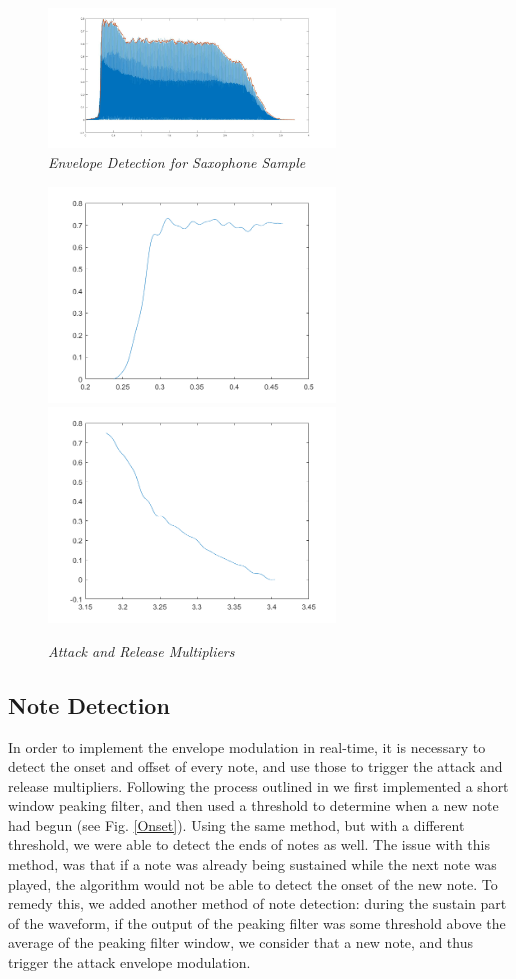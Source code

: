 \documentclass[twoside,a4paper]{article}
\begin{document}
\begin{figure}[ht]
  \includegraphics[width=3in]{Pictures/EnvDetection.jpg}
  \centering
  \caption{\label{SaxEnv} {\it Envelope Detection for Saxophone Sample}}
  \end{figure}

\begin{figure}[ht]
  \includegraphics[width=3in]{Pictures/Attack_Env.png}
  \centering
  \includegraphics[width=3in]{Pictures/Release_Env.png}
  \centering
  \caption{\label{AttRel} {\it Attack and Release Multipliers}}
  \end{figure}

\subsection{Note Detection}
In order to implement the envelope modulation in real-time, it is necessary to detect
the onset and offset of every note, and use those to trigger the attack
and release multipliers. Following the process outlined in \cite{NoteOnset}
we first implemented a short window peaking filter, and then used a threshold
to determine when a new note had begun (see Fig. \ref{Onset}). Using the same method,
but with a different threshold, we were able to detect the ends of notes as well.
The issue with this method, was that if a note was already being sustained while
the next note was played, the algorithm would not be able to detect the onset of
the new note. To remedy this, we added another method of note detection: during
the sustain part of the waveform, if the output of the peaking filter was some
threshold above the average of the peaking filter window, we consider that a new
note, and thus trigger the attack envelope modulation.
\end{document}
